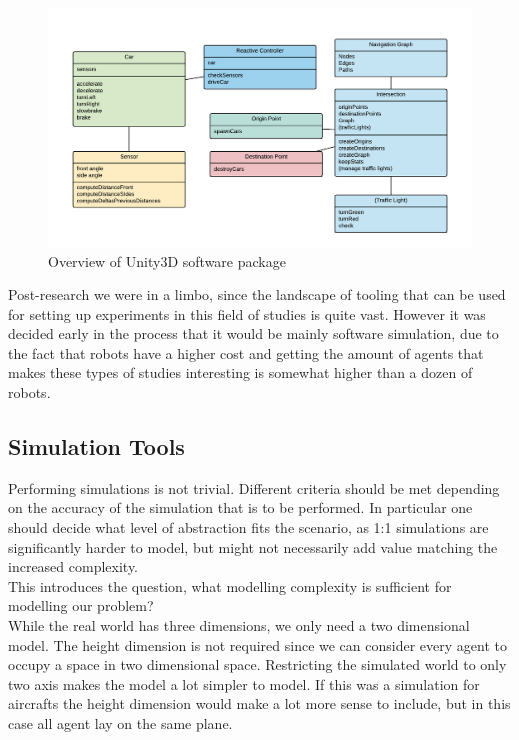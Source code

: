 \begin{figure}
\centering
\includegraphics[scale=.6]{img/classdiagram}
\caption{Overview of Unity3D software package}
\label{figure:classdiagram}
\end{figure}

Post-research we were in a limbo, since the landscape of tooling that can be used for setting up experiments in this field of studies is  quite  vast.
However it was decided early in the process that it would be mainly software simulation, due to the fact that robots have a higher cost and getting the amount of agents that makes these types of studies interesting is somewhat higher than a dozen of robots.

\subsection{Simulation Tools}
Performing simulations is not trivial. Different criteria should be met depending on the accuracy of the simulation that is to be performed.
In particular one should decide what level of abstraction fits the scenario, as 1:1 simulations are significantly harder to model, but might not necessarily add value matching the increased complexity.\\

This introduces the question, what modelling complexity is sufficient for modelling our problem?\\

While the real world has three dimensions, we only need a two dimensional model.
The height dimension is not required since we can consider every agent to occupy a space in two dimensional space.
Restricting the simulated world to only two axis makes the model a lot simpler to model.
If this was a simulation for aircrafts the height dimension would make a lot more sense to include,
but in this case all agent lay on the same plane.\\

